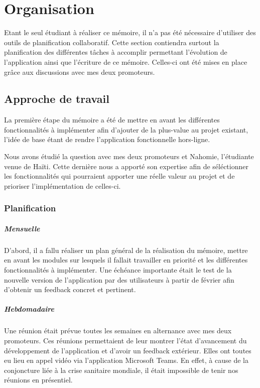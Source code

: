 \documentclass{EPL-master-thesis-covers-FR}
\begin{document}
			
			
			
		
			
			

	\chapter{Organisation}
		Etant le seul étudiant à réaliser ce mémoire, il n'a pas été nécessaire d'utiliser des outils de planification collaboratif. Cette section contiendra surtout la planification des différentes tâches à accomplir permettant l'évolution de l'application ainsi que l'écriture de ce mémoire. Celles-ci ont été mises en place grâce aux discussions avec mes deux promoteurs. 

		\section{Approche de travail}
			La première étape du mémoire a été de mettre en avant les différentes fonctionnalités à implémenter afin d'ajouter de la plus-value au projet existant, l'idée de base étant de rendre l'application fonctionnelle hors-ligne.	
			
			Nous avons étudié la question avec mes deux promoteurs et Nahomie, l'étudiante venue de Haïti. Cette dernière nous a apporté son expertise afin de séléctionner les fonctionnalités qui pourraient apporter une réelle valeur au projet et de prioriser l'implémentation de celles-ci.
		

			\subsection*{Planification}
				\label{sec:planification}
				
				\paragraph*{Mensuelle}
				D'abord, il a fallu réaliser un plan général de la réalisation du mémoire, mettre en avant les modules sur lesquels il fallait travailler en priorité et les différentes fonctionnalités à implémenter. Une échéance importante était le test de la nouvelle version de l'application par des utilisateurs à partir de février afin d'obtenir un feedback concret et pertinent.
								
				\paragraph*{Hebdomadaire} 
				Une réunion était prévue toutes les semaines en alternance avec mes deux promoteurs. Ces réunions permettaient de leur montrer l'état d'avancement du développement de l'application et d'avoir un feedback extérieur. Elles ont toutes eu lieu en appel vidéo via l'application Microsoft Teams. En effet, à cause de la conjoncture liée à la crise sanitaire mondiale, il était impossible de tenir nos réunions en présentiel.
				
\end{document}

